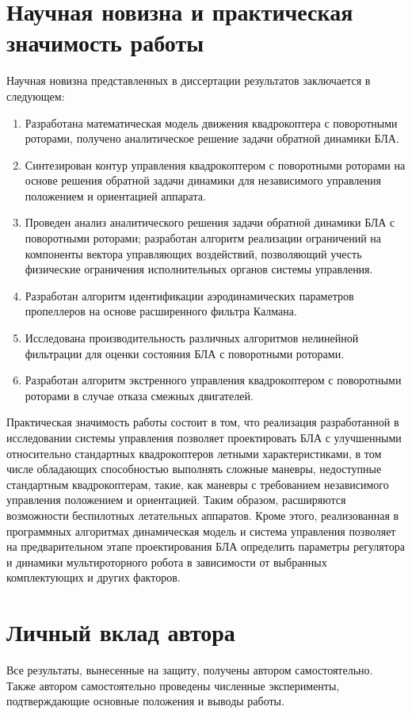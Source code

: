\section{Научная новизна и практическая значимость работы}
Научная новизна представленных в диссертации результатов заключается в следующем:
\begin{enumerate}
	\item  Разработана математическая модель движения квадрокоптера с поворотными роторами, получено аналитическое решение задачи обратной динамики БЛА.
	\item Синтезирован контур управления квадрокоптером с поворотными роторами на основе решения обратной задачи динамики для независимого управления положением и ориентацией аппарата.
	\item  Проведен анализ аналитического решения задачи обратной динамики  БЛА с поворотными роторами; разработан алгоритм реализации ограничений на компоненты вектора управляющих воздействий, позволяющий учесть физические ограничения исполнительных органов системы управления.
	\item Разработан алгоритм идентификации аэродинамических параметров пропеллеров на основе расширенного фильтра Калмана.
	\item Исследована производительность различных алгоритмов нелинейной фильтрации для оценки состояния БЛА с поворотными роторами.
	\item Разработан алгоритм экстренного управления квадрокоптером с поворотными роторами в случае отказа  смежных двигателей.
\end{enumerate}

Практическая значимость работы состоит в том, что
реализация разработанной в исследовании системы управления позволяет проектировать БЛА с улучшенными относительно стандартных квадрокоптеров летными характеристиками, в том числе обладающих способностью 
выполнять сложные маневры, недоступные стандартным квадрокоптерам, такие, как маневры с требованием независимого управления положением и ориентацией.
Таким образом, расширяются возможности беспилотных летательных аппаратов.
Кроме этого, реализованная в программных алгоритмах динамическая модель и система управления позволяет на предварительном этапе проектирования БЛА определить параметры регулятора и динамики мультироторного робота в зависимости от выбранных комплектующих и других факторов.

\section{Личный вклад автора}
Все результаты, вынесенные на защиту, получены автором самостоятельно.
Также автором самостоятельно проведены численные эксперименты,
подтверждающие основные положения и выводы работы.
